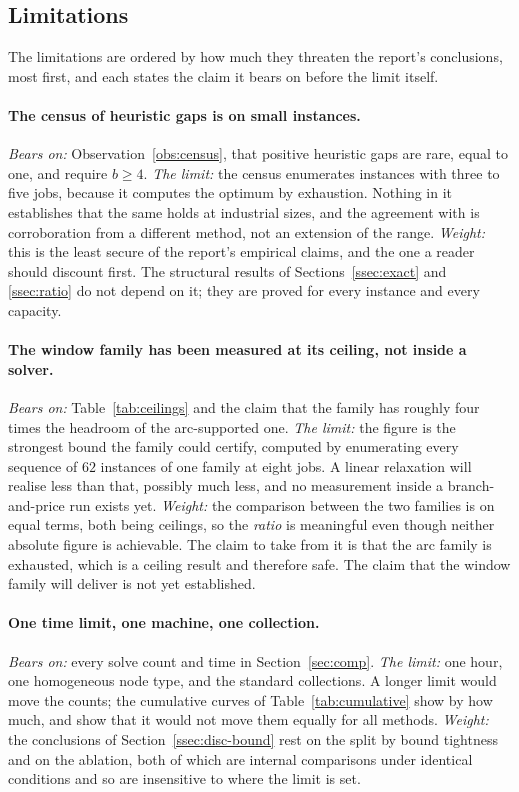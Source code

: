 \subsection{Limitations}\label{ssec:limits}

The limitations are ordered by how much they threaten the report's conclusions, most
first, and each states the claim it bears on before the limit itself.

\paragraph{The census of heuristic gaps is on small instances.}
\emph{Bears on:} Observation~\ref{obs:census}, that positive heuristic gaps are rare,
equal to one, and require $b\ge4$.
\emph{The limit:} the census enumerates instances with three to five jobs, because it
computes the optimum by exhaustion. Nothing in it establishes that the same holds at
industrial sizes, and the agreement with \citet{Burger2015} is corroboration from a
different method, not an extension of the range.
\emph{Weight:} this is the least secure of the report's empirical claims, and the one a
reader should discount first. The structural results of Sections~\ref{ssec:exact} and
\ref{ssec:ratio} do not depend on it; they are proved for every instance and every
capacity.

\paragraph{The window family has been measured at its ceiling, not inside a solver.}
\emph{Bears on:} Table~\ref{tab:ceilings} and the claim that the family has roughly four
times the headroom of the arc-supported one.
\emph{The limit:} the figure is the strongest bound the family could certify, computed
by enumerating every sequence of $62$ instances of one family at eight jobs. A linear
relaxation will realise less than that, possibly much less, and no measurement inside a
branch-and-price run exists yet.
\emph{Weight:} the comparison between the two families is on equal terms, both being
ceilings, so the \emph{ratio} is meaningful even though neither absolute figure is
achievable. The claim to take from it is that the arc family is exhausted, which is a
ceiling result and therefore safe. The claim that the window family will deliver is not
yet established.

\paragraph{One time limit, one machine, one collection.}
\emph{Bears on:} every solve count and time in Section~\ref{sec:comp}.
\emph{The limit:} one hour, one homogeneous node type, and the standard collections. A
longer limit would move the counts; the cumulative curves of Table~\ref{tab:cumulative}
show by how much, and show that it would not move them equally for all methods.
\emph{Weight:} the conclusions of Section~\ref{ssec:disc-bound} rest on the split by
bound tightness and on the ablation, both of which are internal comparisons under
identical conditions and so are insensitive to where the limit is set.

